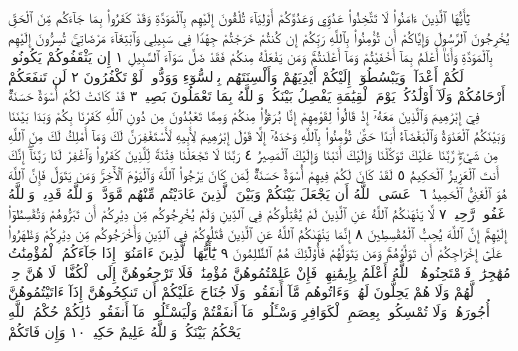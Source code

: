 يَٰٓأَيُّهَا ٱلَّذِينَ ءَامَنُوا۟ لَا تَتَّخِذُوا۟ عَدُوِّي وَعَدُوَّكُمْ أَوْلِيَآءَ تُلْقُونَ إِلَيْهِم
بِٱلْمَوَدَّةِ وَقَدْ كَفَرُوا۟ بِمَا جَآءَكُم مِّنَ ٱلْحَقِّ يُخْرِجُونَ ٱلرَّسُولَ وَإِيَّاكُمْ أَن
تُؤْمِنُوا۟ بِٱللَّهِ رَبِّكُمْ إِن كُنتُمْ خَرَجْتُمْ جِهَٰدࣰا فِي سَبِيلِي وَٱبْتِغَآءَ مَرْضَاتِيۚ
تُسِرُّونَ إِلَيْهِم بِٱلْمَوَدَّةِ وَأَنَا۠ أَعْلَمُ بِمَآ أَخْفَيْتُمْ وَمَآ أَعْلَنتُمْۚ وَمَن
يَفْعَلْهُ مِنكُمْ فَقَدْ ضَلَّ سَوَآءَ ٱلسَّبِيلِ ١ إِن يَثْقَفُوكُمْ يَكُونُوا۟ لَكُمْ أَعْدَآءࣰ
وَيَبْسُطُوٓا۟ إِلَيْكُمْ أَيْدِيَهُمْ وَأَلْسِنَتَهُم بِٱلسُّوٓءِ وَوَدُّوا۟ لَوْ تَكْفُرُونَ ٢
لَن تَنفَعَكُمْ أَرْحَامُكُمْ وَلَآ أَوْلَٰدُكُمْۚ يَوْمَ ٱلْقِيَٰمَةِ يَفْصِلُ بَيْنَكُمْۚ وَٱللَّهُ
بِمَا تَعْمَلُونَ بَصِيرࣱ ٣ قَدْ كَانَتْ لَكُمْ أُسْوَةٌ حَسَنَةࣱ فِيٓ إِبْرَٰهِيمَ وَٱلَّذِينَ
مَعَهُۥٓ إِذْ قَالُوا۟ لِقَوْمِهِمْ إِنَّا بُرَءَٰٓؤُا۟ مِنكُمْ وَمِمَّا تَعْبُدُونَ مِن دُونِ ٱللَّهِ
كَفَرْنَا بِكُمْ وَبَدَا بَيْنَنَا وَبَيْنَكُمُ ٱلْعَدَٰوَةُ وَٱلْبَغْضَآءُ أَبَدًا حَتَّىٰ تُؤْمِنُوا۟
بِٱللَّهِ وَحْدَهُۥٓ إِلَّا قَوْلَ إِبْرَٰهِيمَ لِأَبِيهِ لَأَسْتَغْفِرَنَّ لَكَ وَمَآ أَمْلِكُ لَكَ مِنَ
ٱللَّهِ مِن شَيْءࣲۖ رَّبَّنَا عَلَيْكَ تَوَكَّلْنَا وَإِلَيْكَ أَنَبْنَا وَإِلَيْكَ ٱلْمَصِيرُ ٤ رَبَّنَا
لَا تَجْعَلْنَا فِتْنَةࣰ لِّلَّذِينَ كَفَرُوا۟ وَٱغْفِرْ لَنَا رَبَّنَآۖ إِنَّكَ أَنتَ ٱلْعَزِيزُ ٱلْحَكِيمُ ٥
لَقَدْ كَانَ لَكُمْ فِيهِمْ أُسْوَةٌ حَسَنَةࣱ لِّمَن كَانَ يَرْجُوا۟ ٱللَّهَ وَٱلْيَوْمَ ٱلْأٓخِرَۚ
وَمَن يَتَوَلَّ فَإِنَّ ٱللَّهَ هُوَ ٱلْغَنِيُّ ٱلْحَمِيدُ ٦۞ عَسَى ٱللَّهُ أَن يَجْعَلَ بَيْنَكُمْ
وَبَيْنَ ٱلَّذِينَ عَادَيْتُم مِّنْهُم مَّوَدَّةࣰۚ وَٱللَّهُ قَدِيرࣱۚ وَٱللَّهُ غَفُورࣱ رَّحِيمࣱ ٧
لَّا يَنْهَىٰكُمُ ٱللَّهُ عَنِ ٱلَّذِينَ لَمْ يُقَٰتِلُوكُمْ فِي ٱلدِّينِ وَلَمْ يُخْرِجُوكُم
مِّن دِيَٰرِكُمْ أَن تَبَرُّوهُمْ وَتُقْسِطُوٓا۟ إِلَيْهِمْۚ إِنَّ ٱللَّهَ يُحِبُّ ٱلْمُقْسِطِينَ ٨
إِنَّمَا يَنْهَىٰكُمُ ٱللَّهُ عَنِ ٱلَّذِينَ قَٰتَلُوكُمْ فِي ٱلدِّينِ وَأَخْرَجُوكُم مِّن
دِيَٰرِكُمْ وَظَٰهَرُوا۟ عَلَىٰٓ إِخْرَاجِكُمْ أَن تَوَلَّوْهُمْۚ وَمَن يَتَوَلَّهُمْ فَأُو۟لَٰٓئِكَ
هُمُ ٱلظَّٰلِمُونَ ٩ يَٰٓأَيُّهَا ٱلَّذِينَ ءَامَنُوٓا۟ إِذَا جَآءَكُمُ ٱلْمُؤْمِنَٰتُ مُهَٰجِرَٰتࣲ
فَٱمْتَحِنُوهُنَّۖ ٱللَّهُ أَعْلَمُ بِإِيمَٰنِهِنَّۖ فَإِنْ عَلِمْتُمُوهُنَّ مُؤْمِنَٰتࣲ فَلَا
تَرْجِعُوهُنَّ إِلَى ٱلْكُفَّارِۖ لَا هُنَّ حِلࣱّ لَّهُمْ وَلَا هُمْ يَحِلُّونَ لَهُنَّۖ وَءَاتُوهُم
مَّآ أَنفَقُوا۟ۚ وَلَا جُنَاحَ عَلَيْكُمْ أَن تَنكِحُوهُنَّ إِذَآ ءَاتَيْتُمُوهُنَّ أُجُورَهُنَّۚ
وَلَا تُمْسِكُوا۟ بِعِصَمِ ٱلْكَوَافِرِ وَسْـَٔلُوا۟ مَآ أَنفَقْتُمْ وَلْيَسْـَٔلُوا۟ مَآ أَنفَقُوا۟ۚ
ذَٰلِكُمْ حُكْمُ ٱللَّهِ يَحْكُمُ بَيْنَكُمْۖ وَٱللَّهُ عَلِيمٌ حَكِيمࣱ ١٠ وَإِن فَاتَكُمْ
